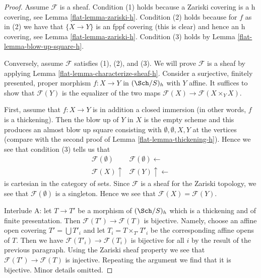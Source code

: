 \begin{proof}

Assume $\mathcal{F}$ is a sheaf. Condition (1) holds because
a Zariski covering is a h covering, see
Lemma \ref{flat-lemma-zariski-h}.
Condition (2) holds because for $f$ as in (2) we have that
$\{X \to Y\}$ is an fppf covering (this is clear)
and hence an h covering, see Lemma \ref{flat-lemma-zariski-h}.
Condition (3) holds by Lemma \ref{flat-lemma-blow-up-square-h}.

\medskip\noindent
Conversely, assume $\mathcal{F}$ satisfies (1), (2), and (3).
We will prove $\mathcal{F}$ is a sheaf by applying
Lemma \ref{flat-lemma-characterize-sheaf-h}. Consider
a surjective, finitely presented, proper morphism
$f : X \to Y$ in $(\Sch/S)_h$ with $Y$ affine. It suffices to show
that $\mathcal{F}(Y)$ is the equalizer of the two maps
$\mathcal{F}(X) \to \mathcal{F}(X \times_Y X)$.

\medskip\noindent
First, assume that $f : X \to Y$ is in addition a closed immersion
(in other words, $f$ is a thickening). Then the blow up of $Y$ in $X$
is the empty scheme and this produces an almost blow up square
consisting with $\emptyset, \emptyset, X, Y$ at the vertices
(compare with the second proof of Lemma \ref{flat-lemma-thickening-h}).
Hence we see that condition (3) tells us that
$$
\begin{array}{cc}\mathcal{F}(\emptyset) & \mathcal{F}(\emptyset) \longleftarrow \\ \mathcal{F}(X) \uparrow & \mathcal{F}(Y) \uparrow\longleftarrow\end{array}
$$
is cartesian in the category of sets. Since $\mathcal{F}$ is a sheaf
for the Zariski topology, we see that $\mathcal{F}(\emptyset)$
is a singleton. Hence we see that $\mathcal{F}(X) = \mathcal{F}(Y)$.

\medskip\noindent
Interlude A: let $T \to T'$ be a morphism of $(\Sch/S)_h$ which is
a thickening and of finite presentation. Then
$\mathcal{F}(T') \to \mathcal{F}(T)$ is bijective.
Namely, choose an affine open covering $T' = \bigcup T'_i$
and let $T_i = T \times_{T'} T'_i$ be the corresponding affine
opens of $T$. Then we have $\mathcal{F}(T'_i) \to \mathcal{F}(T_i)$
is bijective for all $i$ by the result of the previous paragraph.
Using the Zariski sheaf property we see that
$\mathcal{F}(T') \to \mathcal{F}(T)$ is injective. Repeating the
argument we find that it is bijective. Minor details omitted.


\end{proof}
